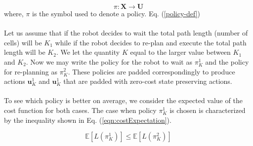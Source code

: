 \documentclass[a4paper,12pt]{article}
\begin{document}
			\begin{equation}
				\pi: \mathbf{X} \rightarrow \mathbf{U}
			\label{policy-def}
			\end{equation}
			where, $\pi$ is the symbol used to denote a policy. Eq. (\ref{policy-def})
			\\
			\\
			Let us assume that if the robot decides to wait the total path length (number of cells) will be $K_1$ while if the robot decides to re-plan and execute the total path length will be $K_2$. We let the quantity $K$ equal to the larger value between $K_1$ and $K_2$. Now we may write the policy for the robot to wait as $\pi_{K}^{1}$ and the policy for re-planning as $\pi_{K}^{2}$. These policies are padded correspondingly to produce actions $\textbf{u}_{K}^{1}$ and $\textbf{u}_{K}^{1}$ that are padded with zero-cost state preserving actions.
			\\
			\\
			To see which policy is better on average, we consider the expected value of the cost function for both cases. The case when policy $\pi_{K}^{1}$ is chosen is characterized by the inequality shown in Eq. (\ref{eqn:costExpectation}).
			
			\begin{equation}
			\mathbb{E}\left[L\left(\pi_{K}^{1}\right)\right] \leq \mathbb{E}\left[L\left(\pi_{K}^{2}\right)\right]
			\label{eqn:costExpectation}
			\end{equation}
			
\end{document}
